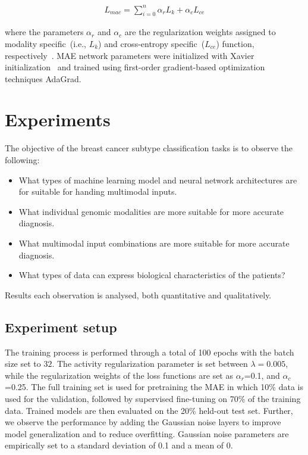 \begin{align}
    L_{mae}=\sum_{i=0}^{n} \alpha_{r} {L}_{k}+\alpha_{c} {L}_{ce}
    \label{eq:sum}
\end{align}

\hspace*{3.5mm} where the parameters $\alpha_{r}$ and $\alpha_{c}$ are the regularization weights assigned to modality specific~(i.e., ${L}_{k}$) and cross-entropy specific~(${L}_{ce}$) function, respectively~\cite{mmdcae}. MAE network parameters were initialized with Xavier initialization~\cite{xavier} and trained using first-order gradient-based optimization techniques AdaGrad. 

\section{Experiments}\label{chapter_4:results}
The objective of the breast cancer subtype classification tasks is to observe the following:

\begin{itemize}[noitemsep]
    \item What types of machine learning model and neural network architectures are for suitable for handing multimodal inputs. 
    \item What individual genomic modalities are more suitable for more accurate diagnosis. 
    \item What multimodal input combinations are more suitable for more accurate diagnosis.
    \item What types of data can express biological characteristics of the patients? 
\end{itemize}

\hspace*{3.5mm} Results each observation is analysed, both quantitative and qualitatively. 

\subsection{Experiment setup}
The training process is performed through a total of 100 epochs with the batch size set to $32$. The activity regularization parameter is set between $\lambda=0.005$, while the regularization weights of the loss functions are set as $\alpha_{r}$=0.1, and $\alpha_{c}$=0.25. The full training set is used for pretraining the MAE in which 10\% data is used for the validation, followed by supervised fine-tuning on 70\% of the training data. Trained models are then evaluated on the 20\% held-out test set. Further, we observe the performance by adding the Gaussian noise layers to improve model generalization and to reduce overfitting. Gaussian noise parameters are empirically set to a standard deviation of 0.1 and a mean of 0. 

